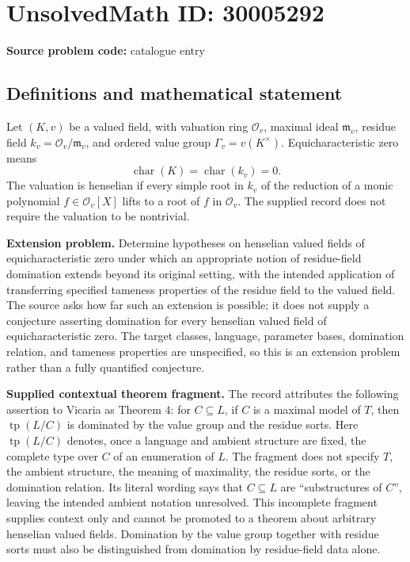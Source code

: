 \documentclass[11pt]{article}
\begin{document}
\section*{UnsolvedMath ID: 30005292}
\textbf{Source problem code:} catalogue entry
\subsection{Definitions and mathematical statement}
Let \((K,v)\) be a valued field, with valuation ring \(\mathcal O_v\), maximal ideal \(\mathfrak m_v\), residue field \(k_v=\mathcal O_v/\mathfrak m_v\), and ordered value group \(\Gamma_v=v(K^\times)\). Equicharacteristic zero means
\[
\operatorname{char}(K)=\operatorname{char}(k_v)=0.
\]
The valuation is henselian if every simple root in \(k_v\) of the reduction of a monic polynomial \(f\in\mathcal O_v[X]\) lifts to a root of \(f\) in \(\mathcal O_v\). The supplied record does not require the valuation to be nontrivial.

\textbf{Extension problem.} Determine hypotheses on henselian valued fields of equicharacteristic zero under which an appropriate notion of residue-field domination extends beyond its original setting, with the intended application of transferring specified tameness properties of the residue field to the valued field. The source asks how far such an extension is possible; it does not supply a conjecture asserting domination for every henselian valued field of equicharacteristic zero. The target classes, language, parameter bases, domination relation, and tameness properties are unspecified, so this is an extension problem rather than a fully quantified conjecture.

\textbf{Supplied contextual theorem fragment.} The record attributes the following assertion to Vicaria as Theorem 4: for \(C\subseteq L\), if \(C\) is a maximal model of \(T\), then \(\operatorname{tp}(L/C)\) is dominated by the value group and the residue sorts. Here \(\operatorname{tp}(L/C)\) denotes, once a language and ambient structure are fixed, the complete type over \(C\) of an enumeration of \(L\). The fragment does not specify \(T\), the ambient structure, the meaning of maximality, the residue sorts, or the domination relation. Its literal wording says that \(C\subseteq L\) are ``substructures of \(C\)'', leaving the intended ambient notation unresolved. This incomplete fragment supplies context only and cannot be promoted to a theorem about arbitrary henselian valued fields. Domination by the value group together with residue sorts must also be distinguished from domination by residue-field data alone.
\end{document}
